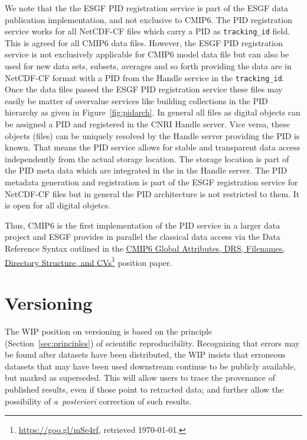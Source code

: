 \documentclass[gmd,manuscript]{copernicus}
\newcommand{\pllabel}[1]{\label{p-#1}\linelabel{l-#1}}
\newcommand{\urlref}[2] {\href{#1}{#2}\footnote{\url{#1}, retrieved \today.}}
\begin{document}
\pllabel{RC1-57}
We note that the the ESGF PID registration service is part of the ESGF
data publication implementation, and not exclusive to CMIP6. The PID
registration service works for all NetCDF-CF files which carry a PID
as \texttt{tracking\_id} field. This is agreed for all CMIP6 data
files. However, the ESGF PID registration service is not exclusively
applicable for CMIP6 model data file but can also be used for new data
sets, subsets, averages and so forth providing the data are in
NetCDF-CF format with a PID from the Handle service in the
\texttt{tracking\_id}. Once the data files passed the ESGF PID
registration service these files may easily be matter of overvalue
services like building collections in the PID hierarchy as given in
Figure~\ref{fig:pidarch}. In general all files as digital objects can
be assigned a PID and registered in the CNRI Handle server. Vice
versa, these objects (files) can be uniquely resolved by the Handle
server providing the PID is known. That means the PID service allows
for stable and transparent data access independently from the actual
storage location. The storage location is part of the PID meta data
which are integrated in the in the Handle server. The PID metadata
generation and registration is part of the ESGF registration service
for NetCDF-CF files but in general the PID architecture is not
restricted to them. It is open for all digital objetcs.

Thus, CMIP6 is the first implementation of the PID service in a larger
data project and ESGF provides in parallel the classical data access
via the Data Reference Syntax outlined in the
\urlref{https://goo.gl/mSe4rf}{CMIP6 Global Attributes, DRS,
  Filenames, Directory Structure, and CVs} position paper.

\section{Versioning}
\label{sec:version}

The WIP position on versioning is based on the principle
(Section~\ref{sec:principles}) of scientific reproducibility.
Recognizing that errors may be found after datasets have been
distributed, the WIP insists that erroneous datasets that may have
been used downstream continue to be publicly available, but marked as
superseded. This will allow users to trace the provenance of published
results, even if those point to retracted data; and further allow the
possibility of \emph{a~posteriori} correction of such results.
\end{document}
